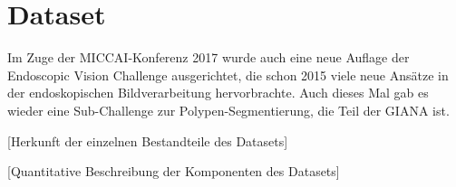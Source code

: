 \section{Dataset}

Im Zuge der MICCAI-Konferenz 2017 wurde auch eine neue Auflage der Endoscopic Vision Challenge ausgerichtet, die schon 2015 viele neue Ansätze in der endoskopischen Bildverarbeitung hervorbrachte.
Auch dieses Mal gab es wieder eine Sub-Challenge zur Polypen-Segmentierung, die Teil der GIANA ist.

[Herkunft der einzelnen Bestandteile des Datasets]

[Quantitative Beschreibung der Komponenten des Datasets]
